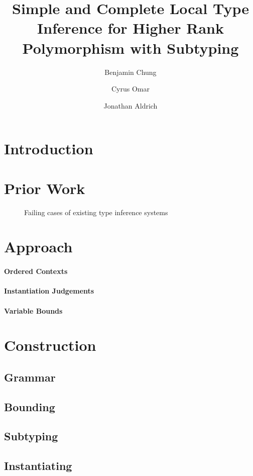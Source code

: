 \documentclass{llncs}
\title{Simple and Complete Local Type Inference for Higher Rank Polymorphism with Subtyping}
\author{Benjamin Chung\and Cyrus Omar \and Jonathan Aldrich}
\institute{\email{\{bwchung,comar,aldrich\}@cs.cmu.edu}\\Carnegie Mellon University}
\begin{document}
\maketitle
\begin{abstract}
\end{abstract}

\section{Introduction}
\section{Prior Work}

\begin{figure}

\label{fig:cons}
\caption{Failing cases of existing type inference systems}
\end{figure}

\section{Approach}
\paragraph{Ordered Contexts}
\paragraph{Instantiation Judgements}
\paragraph{Variable Bounds}


\section{Construction}
\subsection{Grammar}
\subsection{Bounding}
\subsection{Subtyping}
\subsection{Instantiating}
\end{document}
